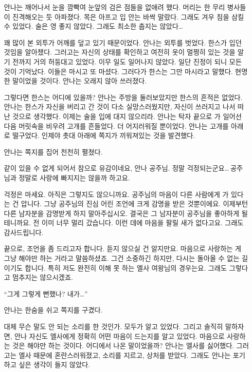 안나는 깨어나서 눈을 깜빡여 눈앞의 검은 점들을 없애려 했다. 머리는 한 무리 병사들이 진격해오는 듯 아파졌다. 목은 아프고 입 안는 바싹 말랐다. 그래도 겨우 침을 삼킬 수 있었다. 술은 영 좋지 않았다. 그래도 최소한 춥지는 않았다\ldots

꽤 많이 본 외투가 어깨를 덮고 있기 때문이었다. 안나는 외투를 벗었다. 한스가 입던 것임을 알아챘다. 그러고는 자신의 상태를 확인하고 여전히 옷이 멀쩡히 있는 것을 알기 전까지 거의 허둥대고 있었다. 이무 일도 일어나지 않았다. 일단 진정이 되니 모든 것이 기억났다. 이들은 마시고 또 마셨다. 그러다가 한스는 그만 마시라고 말했다. 현명한 말이었을 것이다. 안나는 오래지 않아 쓰러졌다.

그렇다면 한스는 어디에 있을까? 안나는 주방을 둘러보았지만 한스의 흔적은 없었다. 안나는 한스가 자신을 버리고 간 것이 다소 실망스러웠지만, 자신이 쓰러지고 나서 떠난 것으로 생각했다. 이제는 술을 입에 대지 않으리라. 안나는 탁자 끝으로 가 일어선 다음 머릿속을 비우려 고개를 흔들었다. 더 어지러워질 뿐이었다. 안나는 고개를 아래로 떨구었다. 인제야 촛대 아래에 쪽지가 끼워져있는 것을 발견했다.

안나는 쪽지를 집어 천천히 펼쳤다.\begin{letter}

같이 있을 수 없게 되어서 참으로 유감이네요, 안나 공주님. 정말 걱정되는군요\ldots\,공주님과 정말로 사랑에 빠지지는 않을까 하고요.

걱정은 마세요. 아직은 그렇지도 않으니까요. 공주님의 마음이 다른 사람에게 가 있다는 건 압니다. 그냥 공주님의 진심 어린 조언에 크게 감명을 받은 것뿐이에요. 이제부턴 다른 남자분을 감명받게 하지 말아주십시오. 결국은 그 남자분이 공주님을 좋아하게 될 테니까요. 전 이미 너무 멀리 갔습니다. 이런 데에 마음을 팔릴 새가 없다고요. 그래도 감사드립니다.

끝으로, 조언을 좀 드리고자 합니다. 듣지 않으실 건 알지만요. 마음으로 사랑하는 게 그냥 해야만 하는 거라고 말씀하셨죠. 그건 소중하긴 하지만, 다시는 돌아올 수 없는 길이기도 합니다. 특히 저도 완전히 이해 못 하는 엘사 여왕님의 경우는요. 그래도 그렇다고 멈추지는 않으시겠죠.

\end{letter}

``그게 그렇게 뻔했나? 내가\ldots''

안나는 한숨을 쉬고 쪽지를 구겼다.

대체 무슨 말도 안 되는 소리를 한 것인가. 모두가 알고 있었다. 그리고 솔직히 말하자면, 안나 자신도 엘사에게 정확히 어떤 마음이 드는지를 알고 있었다. 마음으로 사랑하는 것은 해야만 하는 것이다. 어디에서 나온 말이었을까? 안나는 엘사를 싫어했다. 그러고는 엘사 때문에 혼란스러워졌고, 소리를 지르고, 상처를 받았다. 그래도 안나는 포기하고 싶은 생각이 들지 않았다.

